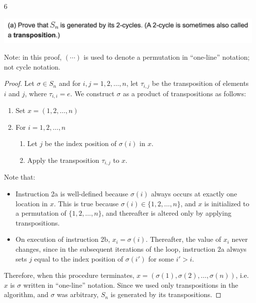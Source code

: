 ~\\~\\
6\\
\begin{mdframed}
\includegraphics[width=400pt]{img/algebra--nf--2-9aa2.png}
\end{mdframed}

Note: in this proof, $(\cdots)$ is used to denote a permutation in ``one-line​'' notation; not cycle notation.


\begin{proof}
  Let $\sigma \in S_n$ and for $i, j = 1, 2, \ldots, n$, let $\tau_{i,j}$ be the transposition of elements
  $i$ and $j$, where $\tau_{i,i} = e$. We construct $\sigma$ as a product of transpositions as follows:

  \begin{enumerate}
  \item Set $x = (1, 2, \ldots, n)$
  \item For $i = 1, 2, \ldots, n$
    \begin{enumerate}
    \item Let $j$ be the index position of $\sigma(i)$ in $x$.
    \item Apply the transposition $\tau_{i,j}$ to $x$.
    \end{enumerate}
  \end{enumerate}
  Note that:
  \begin{itemize}
  \item Instruction 2a is well-defined because $\sigma(i)$ always occurs at exactly one location in
    $x$. This is true because $\sigma(i) \in \{1, 2, \ldots, n\}$, and $x$ is initialized to a permutation
    of $\{1, 2, \ldots, n\}$, and thereafter is altered only by applying transpositions.
  \item On execution of instruction 2b, $x_i = \sigma(i)$. Thereafter, the value of $x_i$ never changes,
    since in the subsequent iterations of the loop, instruction 2a always sets $j$ equal to the
    index position of $\sigma(i')$ for some $i' > i$.
  \end{itemize}

  Therefore, when this procedure terminates, $x = (\sigma(1), \sigma(2), \ldots, \sigma(n))$, i.e.
  $x$ is $\sigma$ written in ``one-line​'' notation. Since we used only transpositions in the algorithm,
  and $\sigma$ was arbitrary, $S_n$ is generated by its transpositions.
\end{proof}

